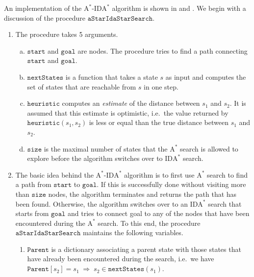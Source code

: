 An implementation of the $\mathrm{A}^*$-$\mathrm{IDA}^*$ algorithm is shown in 
and .  We begin with a discussion of the procedure $\mathtt{aStarIdaStarSearch}$.
\begin{enumerate}
\item The procedure takes 5 arguments.
      \begin{enumerate}[(a)]
      \item $\mathtt{start}$ and $\mathtt{goal}$ are nodes.  The procedure tries to find a path connecting 
            $\mathtt{start}$ and $\mathtt{goal}$.
      \item $\mathtt{nextStates}$ is a function that takes a state $s$ as input and computes the set of states that are
            reachable from $s$ in one step. 
      \item $\mathtt{heuristic}$ computes an \emph{estimate} of the distance between $s_1$ and $s_2$.  It is
            assumed that this estimate is optimistic, i.e.~the value returned by $\mathtt{heuristic}(s_1, s_2)$ 
            is less or equal than the true distance between $s_1$ and $s_2$.
      \item $\mathtt{size}$ is the maximal number of states that the $\mathrm{A}^*$ search is allowed to
            explore before the algorithm switches over to $\mathrm{IDA}^*$ search.
      \end{enumerate}
\item The basic idea behind the $\mathrm{A}^*$-$\mathrm{IDA}^*$ algorithm is to first use $\mathrm{A}^*$ search
      to find a path from $\mathtt{start}$ to $\mathtt{goal}$.  If this is successfully done without visiting
      more than $\mathtt{size}$ nodes, the algorithm terminates and returns the path that has been found.  
      Otherwise, the algorithm switches over to an $\mathrm{IDA}^*$ search that starts from $\mathtt{goal}$ and
      tries to connect goal to any of the nodes that have been encountered during the $\mathrm{A}^*$ search.
      To this end, the procedure $\mathtt{aStarIdaStarSearch}$ maintains the following variables.
      \begin{enumerate}
      \item $\mathtt{Parent}$ is a dictionary associating a parent state with those states that have already been
            encountered during the search, i.e.~we have
            \\[0.2cm]
            \hspace*{1.3cm}
            $\mathtt{Parent}[s_2] = s_1 \;\Rightarrow\; s_2 \in \mathtt{nextStates}(s_1)$.

\end{enumerate}
\end{enumerate}
